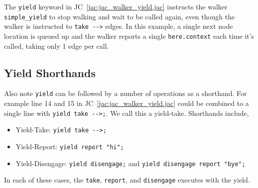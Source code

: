 \par
The \lstinline{yield} keyword in JC~\ref{jac:jac_walker_yield.jac} instructs the walker \lstinline{simple_yield} to stop walking and wait to be called again, even though the walker is instructed to \lstinline{take -->} edges. In this example, a single next node location is queued up and the walker reports a single \lstinline{here.context} each time it's called, taking only 1 edge per call.

\subsection{Yield Shorthands}
\par
Also note \lstinline{yield} can be followed by a number of operations as a shorthand. For example line 14 and 15 in JC~\ref{jac:jac_walker_yield.jac} could be combined to a single line with \lstinline{yield take -->;}. We call this a yield-take. Shorthands include,
\begin{itemize}
    \item Yield-Take: \lstinline{yield take -->;}
    \item Yield-Report: \lstinline{yield report "hi";}
    \item Yield-Disengage: \lstinline{yield disengage;} and \lstinline{yield disengage report "bye";}
\end{itemize}
In each of these cases, the \lstinline{take}, \lstinline{report}, and \lstinline{disengage} executes with the yield.

